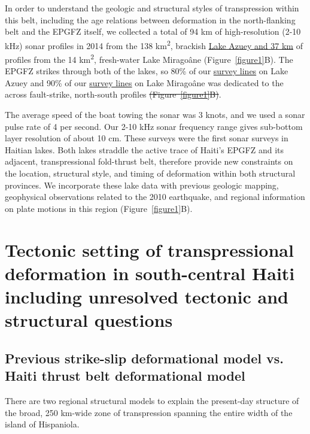 \documentclass[linenumbers,draft]{agujournal}
\begin{document}
In order to understand the geologic and structural styles of transpression within this belt, including the age relations between deformation in the north-flanking belt and the EPGFZ itself, we collected a total of 94 km of high-resolution (2-10 kHz) sonar profiles in 2014 from the 138 km\textsuperscript{2}, brackish \ul{Lake Azuey and 37 km} of profiles from the 14 km\textsuperscript{2}, fresh-water Lake Mirago\^ane (Figure~\ref{figure1}B). The EPGFZ strikes through both of the lakes, so 80\% of our \ul{survey lines} on Lake Azuey and 90\% of our \ul{survey lines} on Lake Mirago\^ane was dedicated to the across fault-strike, north-south profiles \st{(Figure~{\ref{figure1}}B)}. 

The average speed of the boat towing the sonar was 3 knots, and we used a sonar pulse rate of 4 per second. Our 2-10 kHz sonar frequency range gives sub-bottom layer resolution of about 10 cm. These surveys were the first sonar surveys in Haitian lakes. Both lakes straddle the active trace of Haiti's EPGFZ and its adjacent, transpressional fold-thrust belt, therefore provide new constraints on the location, structural style, and timing of deformation within both structural provinces. We incorporate these lake data with previous geologic mapping, geophysical observations related to the 2010 earthquake, and regional information on plate motions in this region (Figure~\ref{figure1}B). 

\section{Tectonic setting of transpressional deformation in south-central Haiti including unresolved tectonic and structural questions}
\label{sec:tectonic}
\subsection{Previous strike-slip deformational model vs. Haiti thrust belt deformational model}
There are two regional structural models to explain the present-day structure of the broad, 250 km-wide zone of transpression spanning the entire width of the island of Hispaniola.
\end{document}

